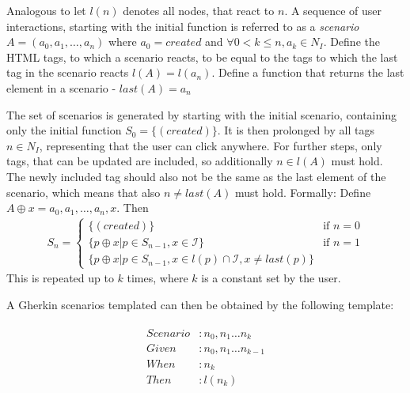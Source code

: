 Analogous to \cite{zhang2019scenario} let $l(n)$ denotes all nodes, that react to $n$. A sequence of user interactions, starting with the initial function is referred to as a \textit{scenario} $A=(a_0,a_1,\ldots, a_n)$ where $a_0=created$ and $\forall0 < k \leq n, a_k \in N_I$. 
Define the HTML tags, to which a scenario reacts, to be equal to the tags to which the last tag in the scenario reacts $l(A)=l(a_n)$. Define a function that returns the last element in a scenario - $last(A) = a_n$

The set of scenarios is generated by starting with the initial scenario, containing only the initial function $S_0 = \{(created)\}$. It is then prolonged by all tags $n \in N_I$, representing that the user can click anywhere. For further steps, only tags, that can be updated are included, so additionally $n \in l(A)$ must hold. The newly included tag should also not be the same as the last element of the scenario, which means that also $n \neq last(A)$ must hold.
Formally:
Define $A \oplus x = a_0,a_1,\ldots,a_n,x$. Then
\begin{align}
    S_n = \begin{cases} 
        \{(created)\} &\mbox{if } n = 0 \\
        \{ p \oplus x |p \in S_{n-1}, x \in \mathcal{I}\} &\mbox{if } n = 1 \\
        \{ p \oplus x |p \in S_{n-1}, x \in l(p) \cap \mathcal{I}, x \neq last(p) \} 
    \end{cases}
\end{align}
This is repeated up to $k$ times, where $k$ is a constant set by the user. 

A Gherkin scenarios templated can then be obtained by the following template:

\begin{align*}
    \label{math:modifiedkneserneyoptimaldiscounts}
    \begin{split}
    Scenario &: n_0,n_1 \ldots n_k \\
    Given &: n_0, n_1 \ldots n_{k-1} \\ 
    When &: n_k \\
    Then &: l(n_k) 
    \end{split}
    \end{align*}


